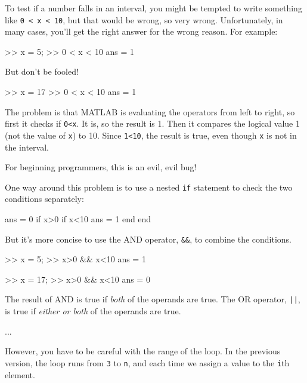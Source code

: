 
To test if a number falls in an interval, you might be
tempted to write something like {\tt 0 < x < 10}, but that
would be wrong, so very wrong.  Unfortunately, in many cases,
you'll get the right answer for the wrong reason.  For
example:

\begin{code}
>> x = 5;
>> 0 < x < 10            %
ans = 1
\end{code}

But don't be fooled!

\begin{code}
>> x = 17
>> 0 < x < 10            %
ans = 1
\end{code}

The problem is that MATLAB is evaluating the operators from left
to right, so first it checks if {\tt 0<x}.  It is, so the result
is 1.  Then it compares the logical value 1 (not the value of
{\tt x}) to 10.  Since {\tt 1<10}, the result is true, even though
{\tt x} is not in the interval.

For beginning programmers, this is an evil, evil bug!


One way around this problem is to use a nested {\tt if} statement to
check the two conditions separately:

\begin{code}
ans = 0
if x>0
    if x<10
        ans = 1
    end
end
\end{code}

But it's more concise to use the AND operator, {\tt \&\&}, to combine the conditions.

\begin{code}
>> x = 5;
>> x>0 && x<10
ans = 1

>> x = 17;
>> x>0 && x<10
ans = 0
\end{code}

The result of AND is true if {\em both} of the operands are
true.  The OR operator, {\tt ||}, is true if {\em either or both}
of the operands are true.



...




However, you have to be careful with the range of the loop.
In the previous version, the loop runs from {\tt 3} to {\tt n},
and each time we assign a value to the {\tt i}th element.  

